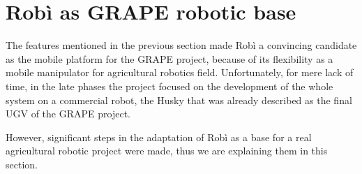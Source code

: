 \section{Robì as GRAPE robotic base}
The features mentioned in the previous section made Robì a convincing candidate as the mobile platform for the \ac{GRAPE} project, because of its flexibility as a mobile manipulator for agricultural robotics field. Unfortunately, for mere lack of time, in the late phases the project focused on the development of the whole system on a commercial robot, the Husky that was already described as the final \ac{UGV} of the \ac{GRAPE} project.
\par However, significant steps in the adaptation of Robì as a base for a real agricultural robotic project were made, thus we are explaining them in this section.

